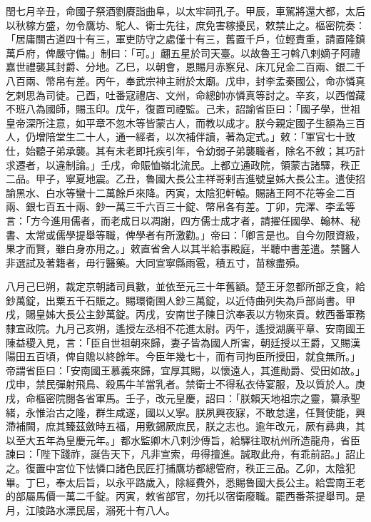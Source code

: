 \begin{pinyinscope}
 閏七月辛丑，命國子祭酒劉賡詣曲阜，以太牢祠孔子。甲辰，車駕將還大都，太后以秋稼方盛，勿令鷹坊、駝人、衛士先往，庶免害稼擾民，敕禁止之。樞密院奏：「居庸關古道四十有三，軍吏防守之處僅十有三，舊置千戶，位輕責重，請置隆鎮萬戶府，俾嚴守備。」制曰：「可。」翽五星於司天臺。以故魯王刁斡八剌嫡子阿禮嘉世禮襲其封爵、分地。乙巳，以朝會，恩賜月赤察兒、床兀兒金二百兩、銀二千八百兩、幣帛有差。丙午，奉武宗神主祔於太廟。戊申，封李孟秦國公，命亦憐真乞剌思為司徒。己酉，吐番寇禮店、文州，命總帥亦憐真等討之。辛亥，以西僧藏不班八為國師，賜玉印。戊午，復置司禋監。己未，詔諭省臣曰：「國子學，世祖皇帝深所注意，如平章不忽木等皆蒙古人，而教以成才。朕今親定國子生額為三百人，仍增陪堂生二十人，通一經者，以次補伴讀，著為定式。」敕：「軍官七十致仕，始聽子弟承襲。其有未老即托疾引年，令幼弱子弟襲職者，除名不敘；其巧計求遷者，以違制論。」壬戌，命賑恤嶺北流民。上都立通政院，領蒙古諸驛，秩正二品。甲子，寧夏地震。乙丑，魯國大長公主祥哥剌吉進號皇姊大長公主。遣使招諭黑水、白水等蠻十二萬餘戶來降。丙寅，太陰犯軒轅。賜諸王阿不花等金二百兩、銀七百五十兩、鈔一萬三千六百三十錠、幣帛各有差。丁卯，完澤、李孟等言：「方今進用儒者，而老成日以凋謝，四方儒士成才者，請擢任國學、翰林、秘書、太常或儒學提舉等職，俾學者有所激勸。」帝曰：「卿言是也。自今勿限資級，果才而賢，雖白身亦用之。」敕直省舍人以其半給事殿庭，半聽中書差遣。禁醫人非選試及著籍者，毋行醫藥。大同宣寧縣雨雹，積五寸，苗稼盡殞。



 八月己巳朔，裁定京朝諸司員數，並依至元三十年舊額。楚王牙忽都所部乏食，給鈔萬錠，出粟五千石賑之。賜環衛圉人鈔三萬錠，以近侍曲列失為戶部尚書。甲戌，賜皇姊大長公主鈔萬錠。丙戌，安南世子陳日泬奉表以方物來貢。敕西番軍務隸宣政院。九月己亥朔，遙授左丞相不花進太尉。丙午，遙授湖廣平章、安南國王陳益稷入見，言：「臣自世祖朝來歸，妻子皆為國人所害，朝廷授以王爵，又賜漢陽田五百頃，俾自贍以終餘年。今臣年幾七十，而有司拘臣所授田，就食無所。」帝謂省臣曰：「安南國王慕義來歸，宜厚其賜，以懷遠人，其進勛爵、受田如故。」戊申，禁民彈射飛鳥、殺馬牛羊當乳者。禁衛士不得私衣侍宴服，及以質於人。庚戌，命樞密院閱各省軍馬。壬子，改元皇慶，詔曰：「朕賴天地祖宗之靈，纂承聖緒，永惟治古之隆，群生咸遂，國以乂寧。朕夙興夜寐，不敢怠遑，任賢使能，興滯補闕，庶其臻茲斂時五福，用敷錫厥庶民，朕之志也。逾年改元，厥有彞典，其以至大五年為皇慶元年。」都水監卿木八剌沙傳旨，給驛往取杭州所造龍舟，省臣諫曰：「陛下踐祚，誕告天下，凡非宣索，毋得擅進。誠取此舟，有乖前詔。」詔止之。復置中宮位下怯憐口諸色民匠打捕鷹坊都總管府，秩正三品。乙卯，太陰犯畢。丁巳，奉太后旨，以永平路歲入，除經費外，悉賜魯國大長公主。給雲南王老的部屬馬價一萬二千錠。丙寅，敕省部官，勿托以宿衛廢職。罷西番茶提舉司。是月，江陵路水漂民居，溺死十有八人。




\end{pinyinscope}
